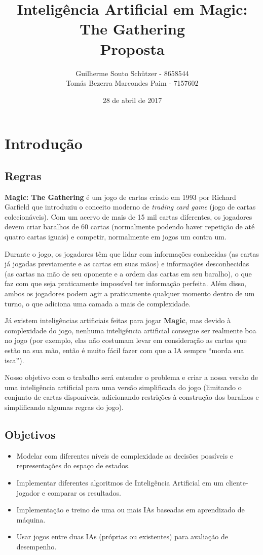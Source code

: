 \documentclass{book}
\title{Inteligência Artificial em Magic: The Gathering\\
        Proposta}
\author{Guilherme Souto Schützer - 8658544 \\
        Tomás Bezerra Marcondes Paim - 7157602}
\date{28 de abril de 2017}
\begin{document}
\maketitle

\chapter{Introdução}

\section{Regras}
\textbf{Magic: The Gathering} é um jogo de cartas criado em 1993 por
Richard Garfield que introduziu o conceito moderno de \textit{trading
card game} (jogo de cartas colecionáveis). Com um acervo de mais de 15
mil cartas diferentes, os jogadores devem criar baralhos de 60 cartas
(normalmente podendo haver repetição de até quatro cartas iguais) e
competir, normalmente em jogos um contra um.
\par Durante o jogo, os jogadores têm que lidar com informações
conhecidas (as cartas já jogadas previamente e as cartas em suas mãos) e
informações desconhecidas (as cartas na mão de seu oponente e a ordem
das cartas em seu baralho), o que faz com que seja praticamente
impossível ter informação perfeita. Além disso, ambos os jogadores podem
agir a praticamente qualquer momento dentro de um turno, o que adiciona
uma camada a mais de complexidade.
\par Já existem inteligências artificiais feitas para jogar
\textbf{Magic}, mas devido à complexidade do jogo, nenhuma inteligência
artificial consegue ser realmente boa no jogo (por exemplo, elas não
costumam levar em consideração as cartas que estão na sua mão, então é
muito fácil fazer com que a IA sempre ``morda sua isca'').
\par Nosso objetivo com o trabalho será entender o problema e criar a
nossa versão de uma inteligência artificial para uma versão simplificada
do jogo (limitando o conjunto de cartas disponíveis, adicionando
restrições à construção dos baralhos e simplificando algumas regras do
jogo).

\section{Objetivos}

\begin{itemize}
    \item{} Modelar com diferentes níveis de complexidade as decisões
possíveis e representações do espaço de estados.
    \item{} Implementar diferentes algoritmos de Inteligência Artificial
em um cliente-jogador e comparar os resultados.
    \item{} Implementação e treino de uma ou mais IAs baseadas em
aprendizado de máquina.
    \item{} Usar jogos entre duas IAs (próprias ou existentes) para
avaliação de desempenho.
\end{itemize}
\end{document}
